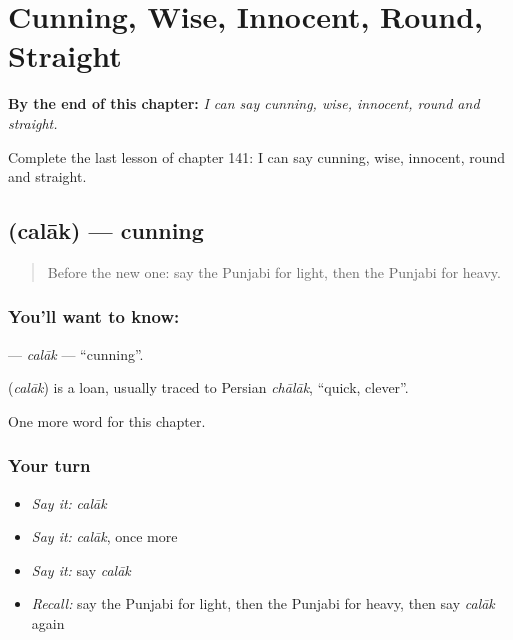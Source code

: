 
\chapter{Cunning, Wise, Innocent, Round, Straight}
\label{ch:pa-cunning-wise-innocent-round-straight}

\begin{chapteropening}
\textbf{By the end of this chapter:} \emph{I can say cunning, wise, innocent, round and straight.}

Complete the last lesson of chapter 141: I can say cunning, wise, innocent, round and straight.
\end{chapteropening}

\section[\texorpdfstring{\pa{ਚਲਾਕ} (calāk)}{ਚਲਾਕ (calāk)}]{ (calāk) — cunning}

\label{lesson:PA-C141-calak}



\begin{quote}
Before the new one: say the Punjabi for light, then the Punjabi for heavy.
\end{quote}

\subsection*{You'll want to know: }
\textbf{} — \emph{calāk} — \textquotedblleft{}cunning\textquotedblright{}.

\begin{cousinweb}
\textbf{} (\emph{calāk}) is a loan, usually traced to Persian \emph{chālāk}, \textquotedblleft{}quick, clever\textquotedblright{}.
\end{cousinweb}

\begin{grammarlens}[title={What you've built}]
One more word for this chapter.
\end{grammarlens}

\subsection*{Your turn}
\begin{itemize}
\raggedright
  \item \emph{Say it:} \emph{calāk}
  \item \emph{Say it:} \emph{calāk}, once more
  \item \emph{Say it:} say \emph{calāk}
  \item \emph{Recall:} say the Punjabi for light, then the Punjabi for heavy, then say \emph{calāk} again
\end{itemize}

